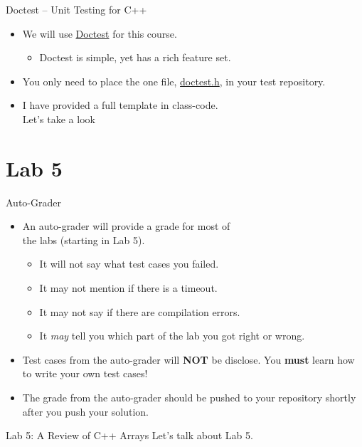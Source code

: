 \documentclass[14pt,aspectratio=1610]{beamer}
\begin{document}
\begin{frame}{Doctest -- Unit Testing for C++}
\begin{itemize}
\item
  We will use \href{https://github.com/doctest/doctest\#readme}{Doctest} for this course.
  \begin{itemize}
  \item
    Doctest is simple, yet has a rich feature set.
  \end{itemize}
\item
  You only need to place the one file, \href{https://github.com/doctest/doctest/blob/master/doctest/doctest.h?raw=true}{doctest.h}, in your test repository.
\item
  I have provided a full template in class-code.\\Let's take a look\textellipsis{}
\end{itemize}
\end{frame}

\section*{Lab 5}

\begin{frame}{Auto-Grader}
  \begin{itemize}
  \item An auto-grader will provide a grade for most of\\ the labs (starting in Lab 5).
  \begin{itemize}
    \item It will not say what test cases you failed.
    \item It may not mention if there is a timeout.
    \item It may not say if there are compilation errors.
    \item It \textit{may} tell you which part of the lab you got right or wrong.
  \end{itemize}
  \item Test cases from the auto-grader will \textbf{NOT} be disclose.  You \textbf{must} learn how to write your own test cases!
  \item The grade from the auto-grader should be pushed to your repository shortly after you push your solution.
  \end{itemize}
\end{frame}

\begin{frame}{Lab 5: A Review of C++ Arrays}
\centering\Large
Let's talk about Lab 5.
\end{frame}
\end{document}
